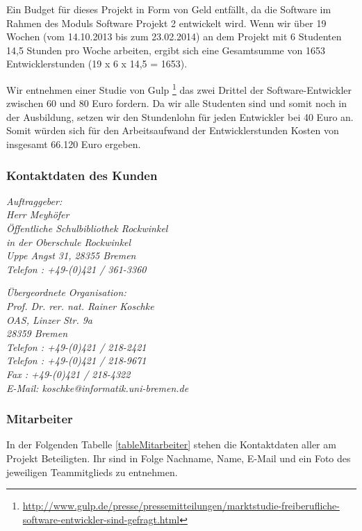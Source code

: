 \documentclass[fontsize=12pt,paper=a4,twoside]{scrartcl}
\begin{document}
Ein Budget für dieses Projekt in Form von Geld entfällt, da die Software im Rahmen des Moduls Software Projekt 2 entwickelt wird. Wenn wir über 19 Wochen (vom 14.10.2013 bis zum 23.02.2014) an dem Projekt mit 6 Studenten 14,5 Stunden pro Woche arbeiten, ergibt sich eine Gesamtsumme von 1653 Entwicklerstunden (19 x 6 x 14,5 = 1653).

Wir entnehmen einer Studie von Gulp \footnote{\url{http://www.gulp.de/presse/pressemitteilungen/marktstudie-freiberufliche-software-entwickler-sind-gefragt.html}} das zwei Drittel der Software-Entwickler zwischen 60 und 80 Euro fordern. Da wir alle Studenten sind und somit noch in der Ausbildung, setzen wir den Stundenlohn für jeden Entwickler bei 40 Euro an. Somit würden sich für den Arbeitsaufwand der Entwicklerstunden Kosten von insgesamt 66.120 Euro ergeben.

\subsubsection{Kontaktdaten des Kunden}

{\em Auftraggeber:\\
	Herr Meyhöfer\\
	Öffentliche Schulbibliothek Rockwinkel\\
	in der Oberschule Rockwinkel\\
	Uppe Angst 31, 28355 Bremen\\
	Telefon : +49-(0)421 / 361-3360\\
}

{\em Übergeordnete Organisation:\\ 
	Prof. Dr. rer. nat. Rainer Koschke\\
	OAS, Linzer Str. 9a\\
	28359 Bremen\\
	Telefon : +49-(0)421 / 218-2421\\
	Telefon : +49-(0)421 / 218-9671\\
	Fax : +49-(0)421 / 218-4322\\
	E-Mail: koschke@informatik.uni-bremen.de
}

\subsubsection{Mitarbeiter}

In der Folgenden Tabelle \ref{tableMitarbeiter} stehen die Kontaktdaten aller am Projekt Beteiligten. Ihr sind in Folge Nachname, Name, E-Mail und ein Foto des jeweiligen Teammitglieds zu entnehmen.
\end{document}
